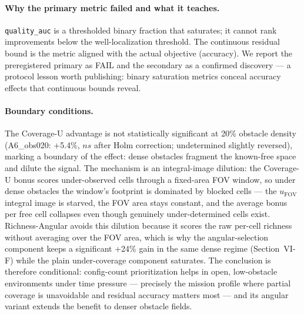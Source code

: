 \documentclass[journal]{IEEEtran}
\newcommand{\CU}{Coverage-U}
\newcommand{\RA}{Richness-Angular}
\newcommand{\ucnt}{u_{\mathrm{FOV}}}
\begin{document}
\paragraph{Why the primary metric failed and what it teaches.}
\texttt{quality\_auc} is a thresholded binary fraction that saturates; it
cannot rank improvements below the well-localization threshold. The continuous
residual bound is the metric aligned with the actual objective (accuracy). We
report the preregistered primary as FAIL and the secondary as a confirmed
discovery --- a protocol lesson worth publishing: binary saturation metrics
conceal accuracy effects that continuous bounds reveal.

\paragraph{Boundary conditions.}
The \CU{} advantage is not statistically significant at 20\% obstacle density
(A6\_obs020: +5.4\%, $ns$ after Holm correction; undetermined slightly
reversed), marking a boundary of the effect: dense obstacles fragment the
known-free space and dilute the signal. The mechanism is an integral-image
dilution: the \CU{} bonus scores under-observed cells through a fixed-area FOV
window, so under dense obstacles the window's footprint is dominated by blocked
cells --- the $\ucnt$ integral image is starved, the FOV
area stays constant, and the average bonus per free cell collapses even though
genuinely under-determined cells exist. \RA{} avoids this dilution because it
scores the raw per-cell richness without averaging over the FOV area, which is
why the angular-selection component keeps a significant +24\% gain in the same
dense regime (Section~VI-F) while the plain under-coverage component saturates.
The conclusion is therefore conditional: config-count prioritization helps in
open, low-obstacle environments under time pressure --- precisely the mission
profile where partial coverage is unavoidable and residual accuracy matters
most --- and its angular variant extends the benefit to denser obstacle fields.
\end{document}
